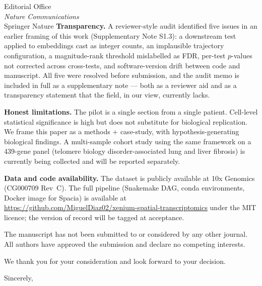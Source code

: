 \documentclass[11pt,a4paper]{letter}
\begin{document}
\begin{letter}{Editorial Office\\\textit{Nature Communications}\\Springer Nature}
\textbf{Transparency.} A reviewer-style audit identified five issues in an earlier framing of this work (Supplementary Note S1.3): a downstream test applied to embeddings cast as integer counts, an implausible trajectory configuration, a magnitude-rank threshold mislabelled as FDR, per-test $p$-values not corrected across cross-tests, and software-version drift between code and manuscript. All five were resolved before submission, and the audit memo is included in full as a supplementary note --- both as a reviewer aid and as a transparency statement that the field, in our view, currently lacks.

\textbf{Honest limitations.} The pilot is a single section from a single patient. Cell-level statistical significance is high but does not substitute for biological replication. We frame this paper as a methods + case-study, with hypothesis-generating biological findings. A multi-sample cohort study using the same framework on a 439-gene panel (telomere biology disorder-associated lung and liver fibrosis) is currently being collected and will be reported separately.

\textbf{Data and code availability.} The dataset is publicly available at 10x Genomics (CG000709 Rev~C). The full pipeline (Snakemake DAG, conda environments, Docker image for Spacia) is available at \url{https://github.com/MiguelDiaz02/xenium-spatial-transcriptomics} under the MIT licence; the version of record will be tagged at acceptance.

The manuscript has not been submitted to or considered by any other journal. All authors have approved the submission and declare no competing interests.

We thank you for your consideration and look forward to your decision.

\closing{Sincerely,}

\end{letter}
\end{document}
